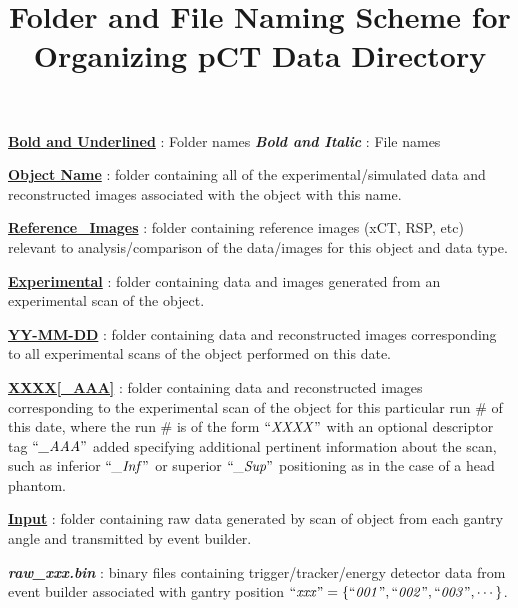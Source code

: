 \documentclass[landscape]{article}
\title{\vspace{-4ex}Folder and File Naming Scheme for Organizing pCT Data Directory}
\date{\vspace{-5ex}}
\begin{document}
\maketitle
\flushleft\ul{\textbf{Bold and Underlined}} : Folder names
\flushleft\textbf{\textit{Bold and Italic}} : File names
\begin{myEnumerate}[labelindent=0pt, leftmargin=*]
    \item \ul{\textbf{Object Name}} : folder containing all of the experimental/simulated data and reconstructed images associated with the object with this name.
    \begin{myEnumerate}[labelindent=1pt, leftmargin=*]
        \item \ul{\textbf{Reference\_Images}} : folder containing reference images (xCT, RSP, etc) relevant to analysis/comparison of the data/images for this object and data type.
        \item \ul{\textbf{Experimental}} : folder containing data and images generated from an experimental scan of the object.
        \begin{myEnumerate}[labelindent=1pt, leftmargin=*]
            \item \ul{\textbf{YY-MM-DD}} : folder containing data and reconstructed images corresponding to all experimental scans of the object performed on this date.
            \begin{myEnumerate}[labelindent=1pt, leftmargin=*]
                \item \ul{\textbf{XXXX[\_AAA]}} : folder containing data and reconstructed images corresponding to the experimental scan of the object for this particular run \# of this date, where the run \# is of the form $\textrm{``\textit{XXXX}''}$ with an optional descriptor tag $\textrm{``\textit{\_AAA}''}$ added specifying additional pertinent information about the scan, such as inferior $\textrm{``\textit{\_Inf}''}$ or superior $\textrm{``\textit{\_Sup}''}$ positioning as in the case of a head phantom.
                \begin{myEnumerate}[labelindent=1pt, leftmargin=*]
                    \item \ul{\textbf{Input}} : folder containing raw data generated by scan of object from each gantry angle and transmitted by event builder.
                    \begin{myEnumerate}[labelindent=1pt, leftmargin=*]
                        \item \textbf{\textit{raw\_xxx.bin}} : binary files containing trigger/tracker/energy detector data from event builder associated with gantry position $\textrm{``\textit{xxx}''} =\{\textrm{``\textit{001}''}, \textrm{``\textit{002}''}, \textrm{``\textit{003}''}, \cdots\}$.

\end{myEnumerate}
\end{myEnumerate}
\end{myEnumerate}
\end{myEnumerate}
\end{myEnumerate}
\end{myEnumerate}
\end{document}
